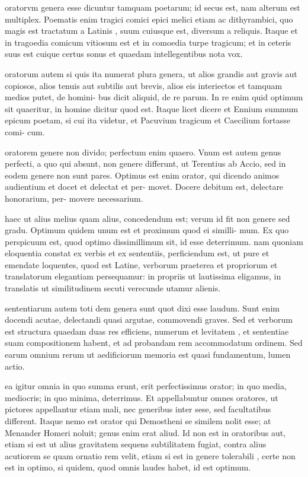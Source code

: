 
 oratorvm genera esse dicuntur tamquam poetarum; id secus est, nam alterum est multiplex. Poematis enim tragici comici epici melici etiam ac dithyrambici, quo magis est tractatum a Latinis , suum cuiusque est, diversum a reliquis. Itaque et in tragoedia comicum vitiosum est et in comoedia turpe tragicum; et in ceteris suus est cuique certus sonus et quaedam intellegentibus nota vox.

 oratorum autem si quis ita numerat plura genera, ut alios grandis aut gravis aut copiosos, alios tenuis aut subtilis aut brevis, alios eis interiectos et tamquam medios putet, de homini- bus dicit aliquid, de re parum. In re enim quid optimum sit quaeritur, in homine dicitur quod est. Itaque licet dicere et Ennium summum epicum poetam, si cui ita videtur, et Pacuvium tragicum et Caecilium fortasse comi- cum.

 oratorem genere non divido; perfectum enim quaero. Vnum est autem genus perfecti, a quo qui absunt, non genere differunt, ut Terentius ab Accio, sed in eodem genere non sunt pares. Optimus est enim orator, qui dicendo animos audientium et docet et delectat et per- movet. Docere debitum est, delectare honorarium, per- movere necessarium.

 haec ut alius melius quam alius, concedendum est; verum id fit non genere sed gradu. Optimum quidem unum est et proximum quod ei similli- mum. Ex quo perspicuum est, quod optimo dissimillimum sit, id esse deterrimum. nam quoniam eloquentia constat ex verbis et ex sententiis, perficiendum est, ut pure et emendate loquentes, quod est Latine, verborum praeterea et propriorum et translatorum elegantiam persequamur: in propriis ut lautissima eligamus, in translatis ut similitudinem secuti verecunde utamur alienis.

 sententiarum autem toti dem genera sunt quot dixi esse laudum. Sunt enim docendi acutae, delectandi quasi argutae, commovendi graves. Sed et verborum est structura quaedam duas res efficiens, numerum et levitatem , et sententiae suam compositionem habent, et ad probandam rem accommodatum ordinem. Sed earum omnium rerum ut aedificiorum memoria est quasi fundamentum, lumen actio.

 ea igitur omnia in quo summa erunt, erit perfectissimus orator; in quo media, mediocris; in quo minima, deterrimus. Et appellabuntur omnes oratores, ut pictores appellantur etiam mali, nec generibus inter sese, sed facultatibus different. Itaque nemo est orator qui Demostheni se similem nolit esse; at Menander Homeri noluit; genus enim erat aliud. Id non est in oratoribus aut, etiam si est ut alius gravitatem sequens subtilitatem fugiat, contra alius acutiorem se quam ornatio rem velit, etiam si est in genere tolerabili , certe non est in optimo, si quidem, quod omnis laudes habet, id est optimum.

